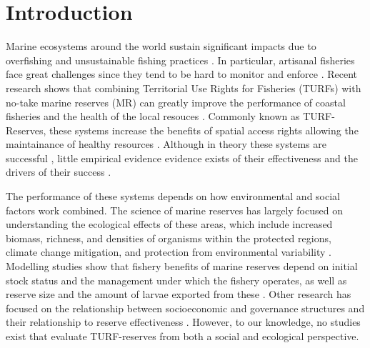 \documentclass{frontiersSCNS}
\begin{document}
\clearpage

\section{Introduction}\label{introduction}

Marine ecosystems around the world sustain significant impacts due to
overfishing and unsustainable fishing practices
\citep{halpern_2008-dK,worm_2006-IB,pauly_2005-qV}. In particular,
artisanal fisheries face great challenges since they tend to be hard to
monitor and enforce \citep{costello_2012}. Recent research shows that
combining Territorial Use Rights for Fisheries (TURFs) with no-take
marine reserves (MR) can greatly improve the performance of coastal
fisheries and the health of the local resouces
\citep{costello_2010-Ix,lester_2017}. Commonly known as TURF-Reserves,
these systems increase the benefits of spatial access rights allowing
the maintainance of healthy resources
\citep{afflerbach_2014-HP,lester_2017}. Although in theory these systems
are successful \citep{costello_2010-Ix}, little empirical evidence
evidence exists of their effectiveness and the drivers of their success
\citep{afflerbach_2014-HP,lester_2017}.

The performance of these systems depends on how environmental and social
factors work combined. The science of marine reserves has largely
focused on understanding the ecological effects of these areas, which
include increased biomass, richness, and densities of organisms within
the protected regions, climate change mitigation, and protection from
environmental variability
\citep{lester_2009-Ks,giakoumi_2017-V2,sala_2017-69,roberts_2017-J9,micheli_2012-EU}.
Modelling studies show that fishery benefits of marine reserves depend
on initial stock status and the management under which the fishery
operates, as well as reserve size and the amount of larvae exported from
these \citep{hilborn_2006,krueck_2017-J1}. Other research has focused on
the relationship between socioeconomic and governance structures and
their relationship to reserve effectiveness
\citep{halpern_2013,lpezangarita_2014,mascia_2017-m_}. However, to our
knowledge, no studies exist that evaluate TURF-reserves from both a
social and ecological perspective.
\end{document}
